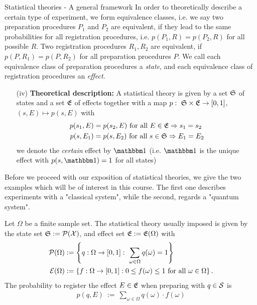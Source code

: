 \begin{section}{Statistical theories - A general framework}
\newline 
In order to theoretically describe a certain type of experiment, we form equivalence classes,
i.e. we say two preparation procedures $P_1$ and $P_2$ are equivalent, if they lead to the same probabilities for all registration procedures, i.e. $p(P_1,R) = p(P_2, R)$ for all possible $R$. Two registration procedures $R_1, R_2$ are equivalent, if $p(P,R_1) = p(P,R_2)$ for all preparation procedures $P$. We call each equivalence class of preparation procedures a \emph{state}, and each equivalence class of registration procedures an \emph{effect}. 
\begin{enumerate}
	\item [(iv)] \textbf{Theoretical description:} A statistical theory is given by a set ${\mathfrak S}$ of states and a set ${\mathfrak E}$ of effects together with a map $p: \ {\mathfrak S} \times {\mathfrak E} \rightarrow [0,1]$, \ $(s, E) \mapsto p(s,E)$ with
	\begin{align*}
	 p(s_1,E) &= p(s_2,E) \ \text{for all} \ E \in {\mathfrak E} \Rightarrow s_1 = s_2 \\ 
	 p(s,E_1) &= p(s,E_2) \ \text{for all} \ s \in {\mathfrak S} \Rightarrow E_1 = E_2 
	\end{align*}
	we denote the \emph{certain} effect by $\bbmeins$ (i.e. $\bbmeins$ is the unique effect with $p(s, \bbmeins) = 1$ for all states)
\end{enumerate}  
Before we proceed with our exposition of statistical theories, we give the two examples which will be of interest in this course. The first one describes experiments with a "classical system", while the second, regards a "quantum system". 
\begin{example}
	Let $\Omega$ be a finite sample set. The statistical theory usually imposed is given by the state set ${\mathfrak S} := {\mathcal P}({\mathcal X})$, and effect set ${\mathfrak E} := {\mathfrak E}(\Omega)$ with
	\begin{align*}
	  {\mathcal P}(\Omega) 
		  &:= \left\{ q: \Omega \rightarrow [0,1]: \ \sum_{\omega\in \Omega}q(\omega) = 1 \right\} \\
	  {\mathcal E}(\Omega)
		  &:= \left\{f: \Omega \rightarrow [0,1]: 0 \leq f(\omega) \leq 1 \ \text{for all} \ \omega \in \Omega   \right\}.
	\end{align*}
	The probability to register the effect $E \in {\mathfrak E}$ when preparing with $q \in {\mathcal S}$ is
	\begin{align*}
	p(q,E) \ := \ \sum_{\omega \in \Omega} q(\omega) \cdot f(\omega)
	\end{align*}
\end{example}

\end{section}
